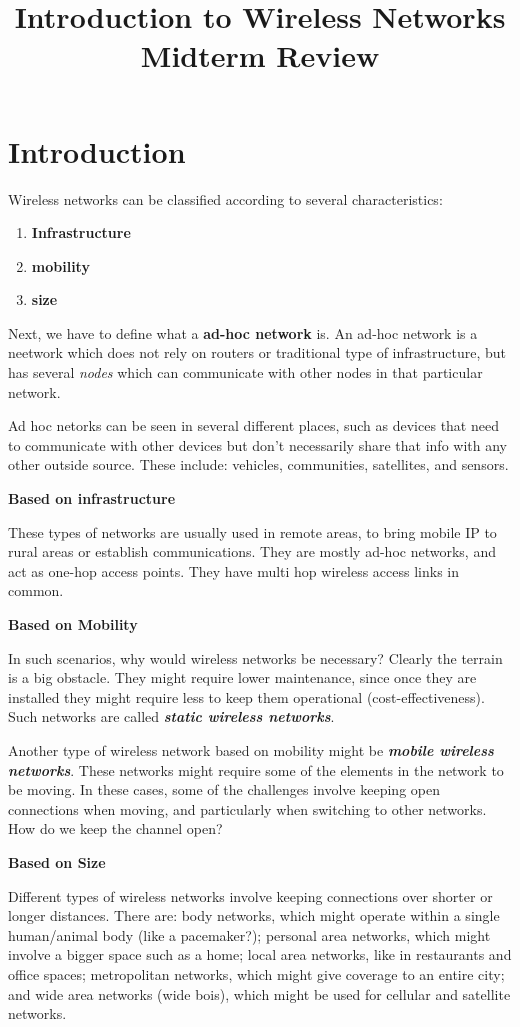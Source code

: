 \documentclass{article}
\title{Introduction to Wireless Networks Midterm Review}
\begin{document}
\section{Introduction}
Wireless networks can be classified according to several characteristics:
\begin{enumerate}
		\item{\textbf{Infrastructure}}
		\item{\textbf{mobility}}
		\item{\textbf{size}}
\end{enumerate}

Next, we have to define what a \textbf{ad-hoc network} is. An ad-hoc network is a neetwork which does
not rely on routers or traditional type of infrastructure, but has several \textit{nodes} which can
communicate with other nodes in that particular network.

Ad hoc netorks can be seen in several different places, such as devices that need to communicate with other devices but
don't necessarily share that info with any other outside source. These include: vehicles, communities, satellites, and sensors. 

\textbf{Based on infrastructure}

These types of networks are usually used in remote areas, to bring mobile IP to rural areas or establish communications.
They are mostly ad-hoc networks, and act as one-hop access points. They have multi hop wireless access links in common.

\textbf{Based on Mobility}

In such scenarios, why would wireless networks be necessary? Clearly the terrain is a big obstacle. They might require
lower maintenance, since once they are installed they might require less to keep them operational (cost-effectiveness). 
Such networks are called \textbf{\textit{static wireless networks}}.

Another type of wireless network based on mobility might be \textbf{\textit{mobile wireless networks}}. These networks
might require some of the elements in the network to be moving. In these cases, some of the challenges involve keeping
open connections when moving, and particularly when switching to other networks. How do we keep the channel open?

\textbf{Based on Size}

Different types of wireless networks involve keeping connections over shorter or longer distances. There are: body networks,
which might operate within a single human/animal body (like a pacemaker?); personal area networks, which might involve a bigger
space such as a home; local area networks, like in restaurants and office spaces; metropolitan networks, which might give 
coverage to an entire city; and wide area networks (wide bois), which might be used for cellular and satellite networks.
\end{document}

